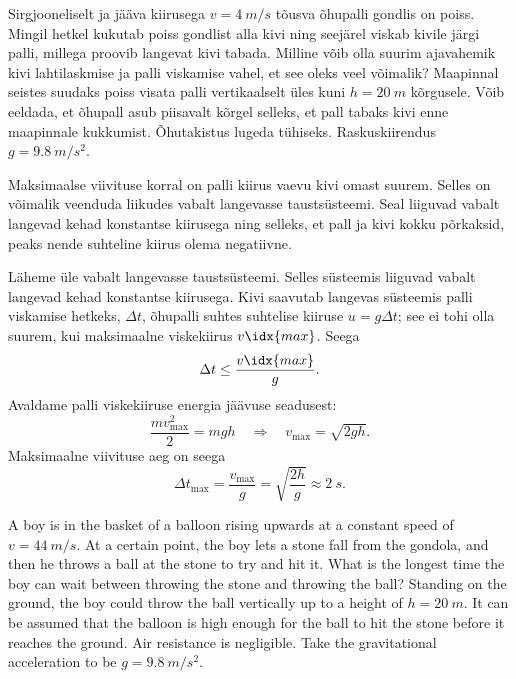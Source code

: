 
Sirgjooneliselt ja jääva kiirusega $v = \SI{4}{m/s}$ tõusva õhupalli gondlis on poiss. Mingil hetkel kukutab poiss gondlist alla kivi ning seejärel viskab kivile järgi palli, millega proovib langevat kivi tabada. Milline võib olla suurim ajavahemik kivi lahtilaskmise ja palli viskamise vahel, et see oleks veel võimalik? Maapinnal seistes suudaks poiss visata palli vertikaalselt üles kuni $h = \SI{20}{m}$ kõrgusele. Võib eeldada, et õhupall asub piisavalt kõrgel selleks, et pall tabaks kivi enne maapinnale kukkumist. Õhutakistus lugeda tühiseks. Raskuskiirendus $g = \SI{9,8}{m/s^2}$.

\hint
Maksimaalse viivituse korral on palli kiirus vaevu kivi omast suurem. Selles on võimalik veenduda liikudes vabalt langevasse taustsüsteemi. Seal liiguvad vabalt langevad kehad konstantse kiirusega ning selleks, et pall ja kivi kokku põrkaksid, peaks nende suhteline kiirus olema negatiivne.

\solu
Läheme üle vabalt langevasse taustsüsteemi. Selles süsteemis liiguvad vabalt langevad kehad konstantse kiirusega. Kivi saavutab langevas süsteemis palli viskamise hetkeks, $\Delta t$, õhupalli suhtes suhtelise kiiruse $u = g\Delta t$; see ei tohi olla suurem, kui maksimaalne viskekiirus $v\idx{max}$. Seega
\[
\Delta t \leq \frac{v\idx{max}}{g}.
\]
Avaldame palli viskekiiruse energia jäävuse seadusest:
\[
\frac{m v_{\max }^{2}}{2}=m g h \quad \Rightarrow \quad v_{\max }=\sqrt{2 g h}.
\]
Maksimaalne viivituse aeg on seega
\[
\Delta t_{\max }=\frac{v_{\max }}{g}=\sqrt{\frac{2 h}{g}} \approx \SI{2}{s}.
\]

A boy is in the basket of a balloon rising upwards at a constant speed of $v=4\SI{4}{m/s}$. At a certain point, the boy lets a stone fall from the gondola, and then he throws a ball at the stone to try and hit it. What is the longest time the boy can wait between throwing the stone and throwing the ball? Standing on the ground, the boy could throw the ball vertically up to a height of $h = \SI{20}{m}$. It can be assumed that the balloon is high enough for the ball to hit the stone before it reaches the ground. Air resistance is negligible. Take the gravitational acceleration to be $g=\SI{9.8}{m/s^2}$.  
\probend
